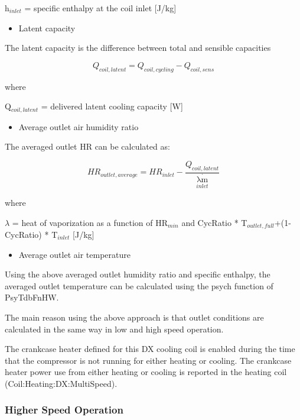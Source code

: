 h\(_{inlet}\) = specific enthalpy at the coil inlet {[}J/kg{]}

\begin{itemize}
  \item Latent capacity
\end{itemize}

The latent capacity is the difference between total and sensible capacities

\begin{equation}
  Q_{coil,latent} = Q_{coil,cycling} - Q_{coil,sens}
\end{equation}

where

Q\(_{coil,latent}\) = delivered latent cooling capacity {[}W{]}

\begin{itemize}
  \item Average outlet air humidity ratio
\end{itemize}

The averaged outlet HR can be calculated as:

\begin{equation}
  HR_{outlet,average} = HR_{inlet} - \frac{Q_{coil,latent}}{\mathop {\lambda m}\limits^\cdot _{inlet}}
\end{equation}

where

\(\lambda\) = heat of vaporization as a function of HR\(_{min}\) and CycRatio * T\(_{outlet,full}\)+(1-CycRatio) * T\(_{inlet}\) {[}J/kg{]}

\begin{itemize}
  \item Average outlet air temperature
\end{itemize}

Using the above averaged outlet humidity ratio and specific enthalpy, the averaged outlet temperature can be calculated using the psych function of PsyTdbFnHW.

The main reason using the above approach is that outlet conditions are calculated in the same way in low and high speed operation.

The crankcase heater defined for this DX cooling coil is enabled during the time that the compressor is not running for either heating or cooling. The crankcase heater power use from either heating or cooling is reported in the heating coil (Coil:Heating:DX:MultiSpeed).

\subsubsection{Higher Speed Operation}\label{higher-speed-operation-000}

